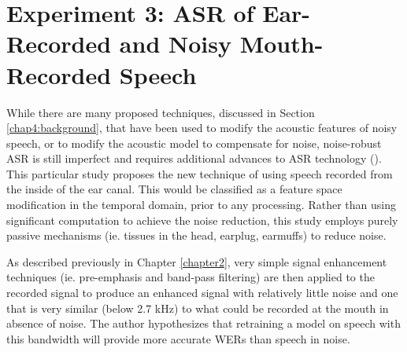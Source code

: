 % 
% 
% 
% 
% 





\section{Experiment 3: ASR of Ear-Recorded and Noisy Mouth-Recorded Speech}\label{expt3}

While there are many proposed techniques, discussed in Section \ref{chap4:background}, that have been used to modify the acoustic features of noisy speech, or to modify the acoustic model to compensate for noise, noise-robust ASR is still imperfect and requires additional advances to ASR technology (\cite{zhang:17}).  This particular study proposes the new technique of using speech recorded from the inside of the ear canal.  This would be classified as a feature space modification in the temporal domain, prior to any processing.  Rather than using significant computation to achieve the noise reduction, this study employs purely passive mechanisms (ie. tissues in the head, earplug, earmuffs) to reduce noise.  

As described previously in Chapter \ref{chapter2}, very simple signal enhancement techniques (ie. pre-emphasis and band-pass filtering) are then applied to the recorded signal to produce an enhanced signal with relatively little noise and one that is very similar (below 2.7 kHz) to what could be recorded at the mouth in absence of noise.  The author hypothesizes that retraining a model on speech with this bandwidth will provide more accurate WERs than speech in noise.

